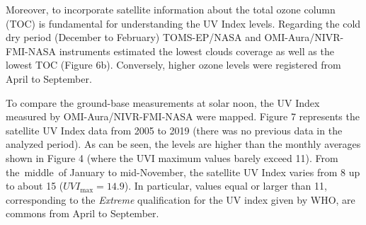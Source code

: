 \documentclass{article}
\begin{document}
{Moreover, to incorporate satellite information about the total ozone
column (TOC) is fundamental for understanding the UV Index levels.
Regarding the cold dry period (December to February) TOMS-EP/NASA and
OMI-Aura/NIVR-FMI-NASA instruments estimated the lowest clouds coverage
as well as the lowest TOC (Figure 6b). %
Conversely, higher ozone levels were registered from April to
September.~

To compare the ground-base measurements at solar noon, the UV Index
measured by OMI-Aura/NIVR-FMI-NASA were mapped.
Figure 7 %
represents the satellite UV Index
data from 2005 to 2019 (there was no previous data in the analyzed
period). As can be seen, the levels are higher than the monthly averages
shown in Figure 4 %
(where the UVI maximum
values barely exceed 11). From the~middle~of January to mid-November,
the satellite UV Index varies from 8 up to about 15
(\(UVI_{\max}=14.9\)). In particular, values equal or larger than 11,
corresponding to the \emph{Extreme} qualification for the UV index given
by WHO, are commons from April to September.

}
\end{document}
